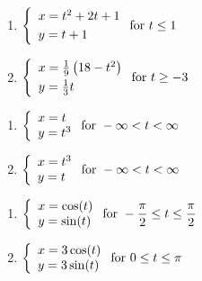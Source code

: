 \documentclass{ximera}
\begin{document}
\begin{multicols}{2} \raggedcolumns 
\begin{enumerate}
\setcounter{enumi}{\value{HW}}
\item ${\displaystyle \left\{ \begin{array}{l} x = t^2+2t+1 \\[3pt] y = t+1 \end{array} \right. \vspace{.25in} \mbox{for } t \leq 1}$
\item ${\displaystyle \left\{ \begin{array}{l} x = \frac{1}{9}\left(18-t^2\right) \\[3pt] y = \frac{1}{3} t \end{array} \right. \vspace{.25in} \mbox{for } t \geq -3}$

\setcounter{HW}{\value{enumi}}
\end{enumerate}
\end{multicols}


\begin{multicols}{2} \raggedcolumns 
\begin{enumerate}
\setcounter{enumi}{\value{HW}}

\item ${\displaystyle \left\{ \begin{array}{l} x = t \\ y = t^3 \end{array} \right. \vspace{.25in} \mbox{for } -\infty < t < \infty}$
\item ${\displaystyle \left\{ \begin{array}{l} x = t^3 \\ y = t \end{array} \right. \vspace{.25in} \mbox{for } -\infty < t < \infty}$

\setcounter{HW}{\value{enumi}}
\end{enumerate}
\end{multicols}

\begin{multicols}{2} \raggedcolumns 
\begin{enumerate}
\setcounter{enumi}{\value{HW}}
\item ${\displaystyle \left\{ \begin{array}{l} x = \cos(t) \\ y = \sin(t) \end{array} \right. \vspace{.25in} \mbox{for } -\dfrac{\pi}{2} \leq t \leq \dfrac{\pi}{2}}$
\item ${\displaystyle \left\{ \begin{array}{l} x = 3\cos(t) \\ y = 3\sin(t) \end{array} \right. \vspace{.25in} \mbox{for } 0 \leq t \leq \pi}$


\setcounter{HW}{\value{enumi}}
\end{enumerate}
\end{multicols}
\end{document}
